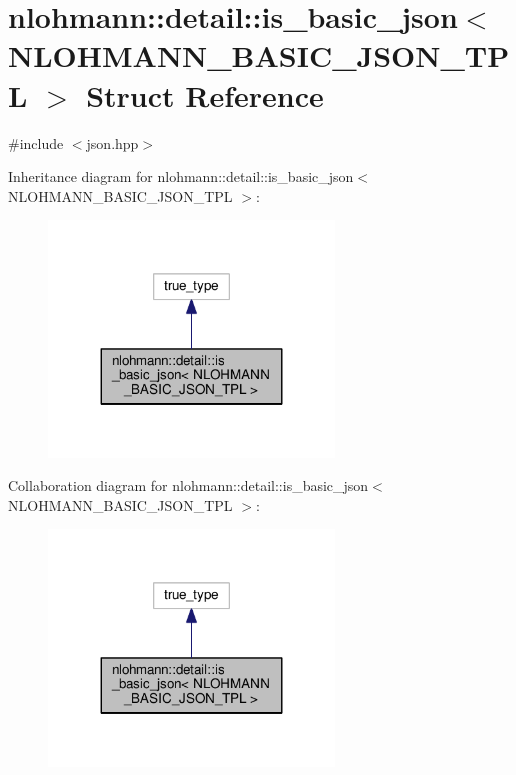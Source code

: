 \hypertarget{structnlohmann_1_1detail_1_1is__basic__json_3_01_n_l_o_h_m_a_n_n___b_a_s_i_c___j_s_o_n___t_p_l_01_4}{}\section{nlohmann\+:\+:detail\+:\+:is\+\_\+basic\+\_\+json$<$ N\+L\+O\+H\+M\+A\+N\+N\+\_\+\+B\+A\+S\+I\+C\+\_\+\+J\+S\+O\+N\+\_\+\+T\+PL $>$ Struct Reference}
\label{structnlohmann_1_1detail_1_1is__basic__json_3_01_n_l_o_h_m_a_n_n___b_a_s_i_c___j_s_o_n___t_p_l_01_4}


{\ttfamily \#include $<$json.\+hpp$>$}



Inheritance diagram for nlohmann\+:\+:detail\+:\+:is\+\_\+basic\+\_\+json$<$ N\+L\+O\+H\+M\+A\+N\+N\+\_\+\+B\+A\+S\+I\+C\+\_\+\+J\+S\+O\+N\+\_\+\+T\+PL $>$\+:
\nopagebreak
\begin{figure}[H]
\begin{center}
\leavevmode
\includegraphics[width=215pt]{structnlohmann_1_1detail_1_1is__basic__json_3_01_n_l_o_h_m_a_n_n___b_a_s_i_c___j_s_o_n___t_p_l_01_4__inherit__graph}
\end{center}
\end{figure}


Collaboration diagram for nlohmann\+:\+:detail\+:\+:is\+\_\+basic\+\_\+json$<$ N\+L\+O\+H\+M\+A\+N\+N\+\_\+\+B\+A\+S\+I\+C\+\_\+\+J\+S\+O\+N\+\_\+\+T\+PL $>$\+:
\nopagebreak
\begin{figure}[H]
\begin{center}
\leavevmode
\includegraphics[width=215pt]{structnlohmann_1_1detail_1_1is__basic__json_3_01_n_l_o_h_m_a_n_n___b_a_s_i_c___j_s_o_n___t_p_l_01_4__coll__graph}
\end{center}
\end{figure}


